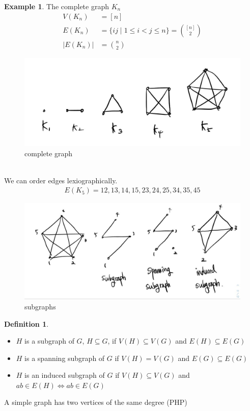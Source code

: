\documentclass{article}
\theoremstyle{definition}
\newtheorem{defn}{Definition}[]
\newtheorem{ex}{Example}[]
\begin{document}
\begin{ex}
    The complete graph $K_n$ 
    \begin{align*}
        V(K_n) &= [n] \\
        E(K_n) &= \{ij \;\vert\; 1 \le i < j \le n\} = {[n] \choose 2} \\
        \vert E(K_n) \vert &= {n \choose 2}
    \end{align*}
    \begin{figure}[!h]
        \centerline{\includegraphics[width=0.5\columnwidth]{cp_graph.jpg}}
        \caption{complete graph}
        \label{cp graph} 
    \end{figure}
    \\
    We can order edges lexiographically.
    \begin{align*}
        E(K_5) = {12, 13, 14, 15, 23, 24, 25, 34, 35, 45}
    \end{align*}
\end{ex}
\begin{figure}[!h]
    \centerline{\includegraphics[width=0.5\columnwidth]{subgraphs.jpg}}
    \caption{subgraphs}
    \label{sg} 
\end{figure}
\begin{defn}
    \begin{itemize}
    \item    $H$ is a subgraph of $G$, $H \subseteq G$, if $V(H) \subseteq V(G) $ and $E(H) \subseteq E(G)$ 
    \item $H$ is a spanning subgraph of $G$ if $V(H) = V(G)$ and $E(G) \subseteq E(G)$ 
    \item $H$ is an induced subgraph of $G$ if $V(H) \subseteq V(G)$ and $ab \in E(H) \Leftrightarrow ab \in E(G)$
    \end{itemize}
\end{defn}
A simple graph has two vertices of the same degree (PHP)
\end{document}
